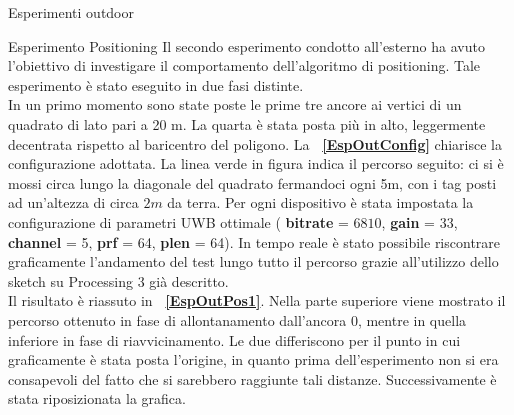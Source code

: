 \documentclass[12pt]{report}
\begin{document}
\begin{section}{Esperimenti outdoor}
\begin{subsection}{Esperimento Positioning}
			Il secondo esperimento condotto all'esterno ha avuto l'obiettivo di investigare il comportamento dell'algoritmo di positioning. Tale esperimento è stato eseguito in due fasi distinte.\\ In un primo momento sono state poste le prime tre ancore ai vertici di un quadrato di lato pari a 20 m. La quarta è stata posta più 			in alto, leggermente decentrata rispetto al baricentro del poligono. La \textbf{\figurename~\ref{EspOutConfig}} chiarisce la configurazione adottata. La linea verde in figura indica il percorso seguito: ci si è mossi circa lungo la diagonale del quadrato fermandoci ogni 5m, con i tag posti ad un'altezza di circa $2m				$ da terra. 
			Per ogni dispositivo è stata impostata la configurazione di parametri UWB ottimale ( \textbf{bitrate} = $6810$, \textbf{gain} = $33$, \textbf{channel} = 5, \textbf{prf} = 64, \textbf{plen} = 64). In tempo reale è stato possibile riscontrare graficamente l'andamento del test lungo tutto il percorso grazie 							all'utilizzo dello sketch su Processing 3 già descritto. \\ Il risultato è riassuto in \textbf{\figurename~\ref{EspOutPos1}}. Nella parte superiore viene mostrato il percorso ottenuto in fase di allontanamento dall'ancora 0, mentre in quella inferiore in fase di riavvicinamento. Le due differiscono per il punto in cui 								graficamente è stata posta l'origine, in quanto prima dell'esperimento non si era consapevoli del fatto che si sarebbero raggiunte tali distanze. Successivamente è stata riposizionata la grafica. 


\end{subsection}
\end{section}
\end{document}
